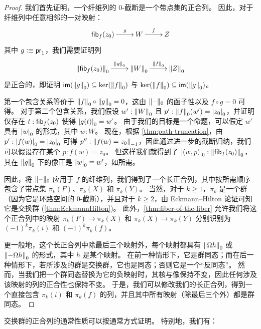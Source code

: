 \vspace*{0pt plus 10ex}
\goodbreak

\begin{proof}
  我们首先证明，一个纤维列的 $0$-截断是一个带点集的正合列。
  因此，对于纤维列中任意相邻的一对映射：
  \[\xymatrix{\hfib{f}{z_0} \ar^-g[r] & W \ar^-f[r] & Z}\]
  其中 $g\defeq \proj1$，我们需要证明列
  \[\xymatrix{\trunc{0}{\hfib{f}{z_0}} \ar^-{\trunc0g}[r] & \trunc0{W}
    \ar^-{\trunc0{f}}[r] & \trunc0{Z}}\]
  是正合的，即证明 $\im(\trunc0g)\subseteq\ker(\trunc0f)$ 与 $\ker(\trunc0f)\subseteq\im(\trunc0g)$。

  第一个包含关系等价于 $\trunc0f\circ\trunc0g=0$，这由 $\truncf0$ 的函子性以及 $f\circ g=0$ 可得。
  对于第二个包含关系，我们假设 $w':\trunc0W$ 且 $p':\trunc0f(w')=\tproj0{z_0}$，并证明仅存在 ${t:\hfib{f}{z_0}}$ 使得 $\tproj0{g(t)}=w'$。
  由于我们的目标是一个命题，可以假定 $w'$ 具有 $\tproj0w$ 的形式，其中 $w:W$。
  现在，根据 \cref{thm:path-truncation}，由 $p' : \tproj0{f(w)}=\tproj0{z_0}$ 可得 $p'': \trunc{-1}{f(w)=z_0}$，因此通过进一步的截断归纳，我们可以假设存在某个 $p:f(w)=z_0$。
  但这样我们就得到了 $\tproj0{(w,p)}:\trunc{0}{\hfib{f}{z_0}}$，其在 $\trunc0g$ 下的像正是 $\tproj0w\jdeq w'$，如所需。

  因此，将 $\truncf0$ 应用于 $f$ 的纤维列，我们得到了一个长正合列，其中按所需顺序包含了带点集 $\pi_k(F)$、$\pi_k(X)$ 和 $\pi_k(Y)$。
  当然，对于 $k\ge1$，$\pi_k$ 是一个群（因为它是环路空间的 $0$-截断），并且对于 $k\ge 2$，由 Eckmann--Hilton 论证可知它是交换群
   (\cref{thm:EckmannHilton})。
  此外，\cref{thm:fiber-of-the-fiber} 允许我们将这个正合列中的映射 $\pi_k(F) \to \pi_k(X)$ 和 $\pi_k(X) \to \pi_k(Y)$ 分别识别为 $(-1)^k \pi_k(i)$ 和 $(-1)^k \pi_k(f)$。

  更一般地，这个长正合列中除最后三个映射外，每个映射都具有 $\trunc0{\Omega h}$ 或 $\trunc0{-\Omega h}$ 的形式，其中 $h$ 是某个映射。
  在前一种情形下，它是群同态；而在后一种情形下，若所涉及的群是交换群，它也是同态；否则它是一个``反同态''。
  然而，当我们把一个群同态替换为它的负映射时，其核与像保持不变，因此任何涉及该映射的列的正合性也保持不变。
  于是，我们可以修改我们的长正合列，得到一个直接包含 $\pi_k(i)$ 和 $\pi_k(f)$ 的列，并且其中所有映射（除最后三个外）都是群同态。
\end{proof}

交换群的正合列的通常性质可以按通常方式证明。
特别地，我们有：


